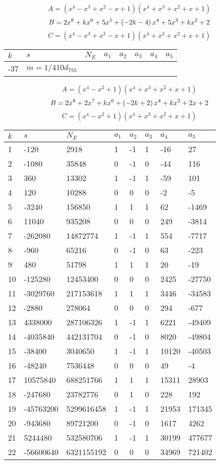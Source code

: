 \documentclass{amsart}
\begin{document}
$$A=(x^4
 - x^3
 + x^2
 - x
 + 1)(x^4
 + x^3
 + x^2
 + x
 + 1)$$
$$B=2\*x^8
 + k\*x^6
 + 5\*x^5
 + \left(-2\*k
 - 4\right) \*x^4
 + 5\*x^3
 + k\*x^2
 + 2$$
$$C=(x^4
 - x^3
 + x^2
 - x
 + 1)(x^4
 + x^3
 + x^2
 + x
 + 1)$$
\begin{longtable}{|l|l|l|lllll|}
\hline
$k$ & $s$ & $N_E$ & $a_1$ & $a_2$ & $a_3$ & $a_4$ & $a_5$\\
\hline
-37&$m=1/410d_{755}$&&\multicolumn{5}{c|}{}\\
\hline
\end{longtable}
$$A=(x^4
 - x^2
 + 1)(x^4
 + x^3
 + x^2
 + x
 + 1)$$
$$B=2\*x^8
 + 2\*x^7
 + k\*x^6
 + \left(-2\*k
 + 2\right) \*x^4
 + k\*x^2
 + 2\*x
 + 2$$
$$C=(x^4
 - x^2
 + 1)(x^4
 + x^3
 + x^2
 + x
 + 1)$$
\begin{longtable}{|l|l|l|lllll|}
\hline
$k$ & $s$ & $N_E$ & $a_1$ & $a_2$ & $a_3$ & $a_4$ & $a_5$\\
\hline
1&-120&2918&1&-1&1&-16&27\\
2&-1080&35848&0&-1&0&-44&116\\
3&360&13302&1&-1&1&-59&101\\
4&120&10288&0&0&0&-2&-5\\
5&-3240&156850&1&1&1&62&-1469\\
6&11040&935208&0&0&0&249&-3814\\
7&-262080&14872774&1&-1&1&554&-7717\\
8&-960&65216&0&-1&0&63&-223\\
9&480&51798&1&1&1&20&-19\\
10&-125280&12453400&0&0&0&2425&-27750\\
11&-3029760&217153618&1&1&1&3446&-34583\\
12&-2880&278064&0&0&0&294&-677\\
13&4338000&287106326&1&-1&1&6221&-49409\\
14&-4035840&442131704&0&-1&0&8020&-49804\\
15&-38400&3040650&1&-1&1&10120&-40503\\
16&-48240&7536448&0&0&0&49&-4\\
17&10575840&688251766&1&1&1&15311&28903\\
18&-247680&23782776&0&1&0&228&192\\
19&-45763200&5299616458&1&-1&1&21953&171345\\
20&-943680&89721200&0&-1&0&1617&4262\\
21&5244480&532580706&1&-1&1&30199&477677\\
22&-56600640&6321155192&0&0&0&34969&721402\\

\end{longtable}
\end{document}
